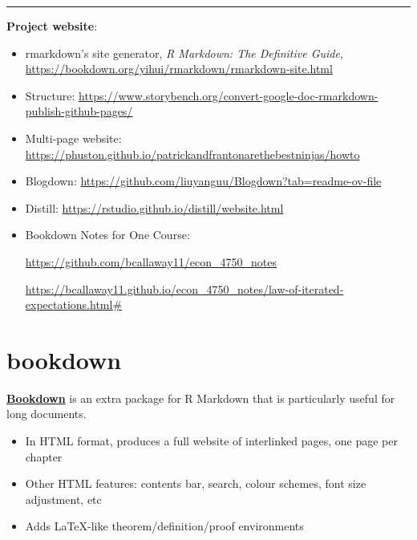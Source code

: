 \documentclass[
  a4paper,
  twoside,
  openright]{book}
\providecommand{\tightlist}{%
  \setlength{\itemsep}{0pt}\setlength{\parskip}{0pt}}
\theoremstyle{definition}
\theoremstyle{definition}
\theoremstyle{definition}
\theoremstyle{definition}
\theoremstyle{remark}
\begin{document}
\begin{center}\rule{0.5\linewidth}{0.5pt}\end{center}

\textbf{Project website}:

\begin{itemize}
\item
  rmarkdown's site generator, \emph{R Markdown: The Definitive Guide}, \url{https://bookdown.org/yihui/rmarkdown/rmarkdown-site.html}
\item
  Structure: \url{https://www.storybench.org/convert-google-doc-rmarkdown-publish-github-pages/}
\item
  Multi-page website: \url{https://phuston.github.io/patrickandfrantonarethebestninjas/howto}
\item
  Blogdown: \url{https://github.com/liuyanguu/Blogdown?tab=readme-ov-file}
\item
  Distill: \url{https://rstudio.github.io/distill/website.html}
\item
  Bookdown Notes for One Course:

  \url{https://github.com/bcallaway11/econ_4750_notes}

  \url{https://bcallaway11.github.io/econ_4750_notes/law-of-iterated-expectations.html\#}
\end{itemize}

\chapter{bookdown}\label{bookdown}

\textbf{\href{https://bookdown.org/yihui/rmarkdown/bookdown-start.html}{Bookdown}} is an extra package for R Markdown that is particularly useful for long documents.

\begin{itemize}
\tightlist
\item
  In HTML format, produces a full website of interlinked pages, one page per chapter
\item
  Other HTML features: contents bar, search, colour schemes, font size adjustment, etc
\item
  Adds LaTeX-like theorem/definition/proof environments
\end{itemize}
\end{document}
